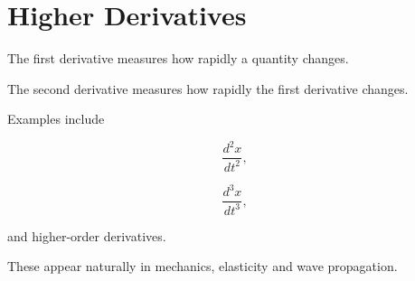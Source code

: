 \section{Higher Derivatives}

The first derivative measures how rapidly a quantity changes.

The second derivative measures how rapidly the first derivative changes.

Examples include

\[
\frac{d^2x}{dt^2},
\]

\[
\frac{d^3x}{dt^3},
\]

and higher-order derivatives.

These appear naturally in mechanics, elasticity and wave propagation.

